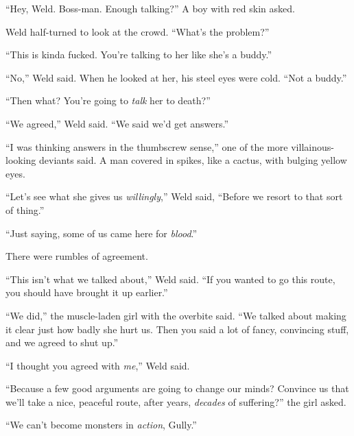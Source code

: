 ``Hey, Weld.  Boss-man.  Enough talking?''  A boy with red skin asked.



Weld half-turned to look at the crowd.  ``What's the problem?''



``This is kinda fucked.  You're talking to her like she's a buddy.''



``No,'' Weld said.  When he looked at her, his steel eyes were cold.  ``Not a buddy.''



``Then what?  You're going to \emph{talk} her to death?''



``We agreed,'' Weld said.  ``We said we'd get answers.''



``I was thinking answers in the thumbscrew sense,'' one of the more villainous-looking deviants said.  A man covered in spikes, like a cactus, with bulging yellow eyes.



``Let's see what she gives us \emph{willingly},'' Weld said, ``Before we resort to that sort of thing.''



``Just saying, some of us came here for \emph{blood}.''



There were rumbles of agreement.



``This isn't what we talked about,'' Weld said.  ``If you wanted to go this route, you should have brought it up earlier.''



``We did,'' the muscle-laden girl with the overbite said.  ``We talked about making it clear just how badly she hurt us.  Then you said a lot of fancy, convincing stuff, and we agreed to shut up.''



``I thought you agreed with \emph{me},'' Weld said.



``Because a few good arguments are going to change our minds?  Convince us that we'll take a nice, peaceful route, after years, \emph{decades} of suffering?''  the girl asked.



``We can't become monsters in \emph{action}, Gully.''



